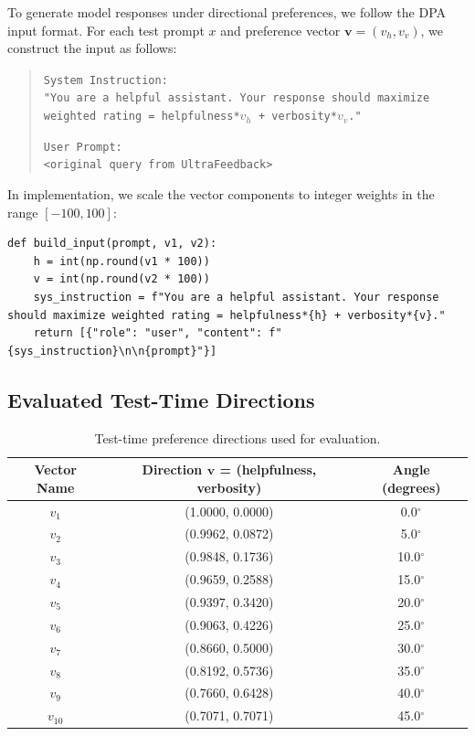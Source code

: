 \documentclass{article} %
\begin{document}
To generate model responses under directional preferences, we follow the DPA input format. For each test prompt $x$ and preference vector $\mathbf{v} = (v_h, v_v)$, we construct the input as follows:

\begin{quote}
\texttt{System Instruction:} \\
\texttt{"You are a helpful assistant. Your response should maximize weighted rating = helpfulness*$v_h$ + verbosity*$v_v$."}

\texttt{User Prompt:} \\
\texttt{<original query from UltraFeedback>}
\end{quote}

In implementation, we scale the vector components to integer weights in the range $[-100, 100]$:

\begin{verbatim}
def build_input(prompt, v1, v2):
    h = int(np.round(v1 * 100))
    v = int(np.round(v2 * 100))
    sys_instruction = f"You are a helpful assistant. Your response should maximize weighted rating = helpfulness*{h} + verbosity*{v}."
    return [{"role": "user", "content": f"{sys_instruction}\n\n{prompt}"}]
\end{verbatim}

\subsection{Evaluated Test-Time Directions}

\begin{table}[t]
\centering
\caption{Test-time preference directions used for evaluation.}
\label{tab:directions_appendix}
\begin{tabular}{c|c|c}
\toprule
\textbf{Vector Name} & \textbf{Direction $\mathbf{v}$ = (helpfulness, verbosity)} & \textbf{Angle (degrees)} \\
\midrule
$v_1$ & (1.0000, 0.0000) & 0.0$^\circ$ \\
$v_2$ & (0.9962, 0.0872) & 5.0$^\circ$ \\
$v_3$ & (0.9848, 0.1736) & 10.0$^\circ$ \\
$v_4$ & (0.9659, 0.2588) & 15.0$^\circ$ \\
$v_5$ & (0.9397, 0.3420) & 20.0$^\circ$ \\
$v_6$ & (0.9063, 0.4226) & 25.0$^\circ$ \\
$v_7$ & (0.8660, 0.5000) & 30.0$^\circ$ \\
$v_8$ & (0.8192, 0.5736) & 35.0$^\circ$ \\
$v_9$ & (0.7660, 0.6428) & 40.0$^\circ$ \\
$v_{10}$ & (0.7071, 0.7071) & 45.0$^\circ$ \\
\bottomrule
\end{tabular}
\end{table}
\end{document}
